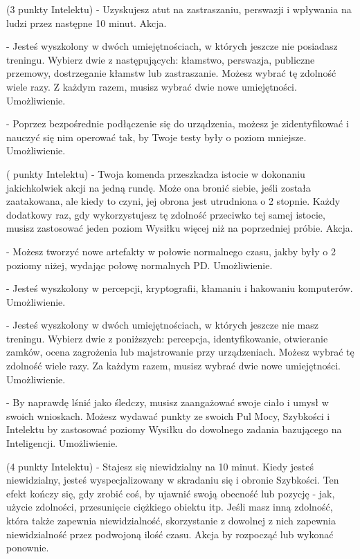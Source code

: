{ (3 punkty Intelektu) - Uzyskujesz atut na zastraszaniu, perswazji i wpływania na ludzi przez następne 10 minut. Akcja.

 - Jesteś wyszkolony w dwóch umiejętnościach, w których jeszcze nie posiadasz treningu. Wybierz dwie z następujących: kłamstwo, perswazja, publiczne przemowy, dostrzeganie kłamstw lub zastraszanie. Możesz wybrać tę zdolność wiele razy. Z każdym razem, musisz wybrać dwie nowe umiejętności. Umożliwienie.

 - Poprzez bezpośrednie podłączenie się do urządzenia, możesz je zidentyfikować i nauczyć się nim operować tak, by Twoje testy były o poziom mniejsze. Umożliwienie.

 ( punkty Intelektu) - Twoja komenda przeszkadza istocie w dokonaniu jakichkolwiek akcji na jedną rundę. Może ona bronić siebie, jeśli została zaatakowana, ale kiedy to czyni, jej obrona jest utrudniona o 2 stopnie. Każdy dodatkowy raz, gdy wykorzystujesz tę zdolność przeciwko tej samej istocie, musisz zastosować jeden poziom Wysiłku więcej niż na poprzedniej próbie. Akcja.  

 - Możesz tworzyć nowe artefakty w połowie normalnego czasu, jakby były o 2 poziomy niżej, wydając połowę normalnych PD. Umożliwienie.

 - Jesteś wyszkolony w percepcji, kryptografii, kłamaniu i hakowaniu komputerów. Umożliwienie.

 - Jesteś wyszkolony w dwóch umiejętnościach, w których jeszcze nie masz treningu. Wybierz dwie z poniższych: percepcja, identyfikowanie, otwieranie zamków, ocena zagrożenia lub majstrowanie przy urządzeniach. Możesz wybrać tę zdolność wiele razy. Za każdym razem, musisz wybrać dwie nowe umiejętności. Umożliwienie. 

 - By naprawdę lśnić jako śledczy, musisz zaangażować swoje ciało i umysł w swoich wnioskach. Możesz wydawać punkty ze swoich Pul Mocy, Szybkości i Intelektu by zastosować poziomy Wysiłku do dowolnego zadania bazującego na Inteligencji. Umożliwienie. 

 (4 punkty Intelektu) - Stajesz się niewidzialny na 10 minut. Kiedy jesteś niewidzialny, jesteś wyspecjalizowany w skradaniu się i obronie Szybkości. Ten efekt kończy się, gdy zrobić coś, by ujawnić swoją obecność lub pozycję - jak, użycie zdolności, przesunięcie ciężkiego obiektu itp. Jeśli masz inną zdolność, która także zapewnia niewidzialność, skorzystanie z dowolnej z nich zapewnia niewidzialność przez podwojoną ilość czasu. Akcja by rozpocząć lub wykonać ponownie.

}
